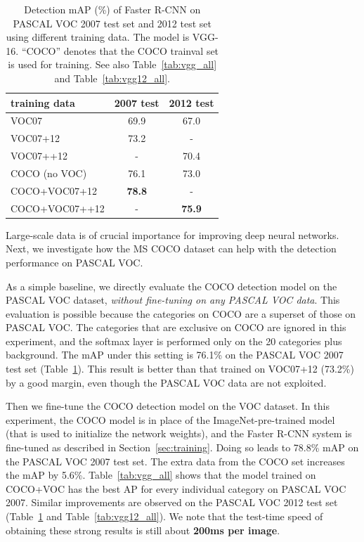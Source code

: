 \documentclass[10pt,journal,cspaper,compsoc]{IEEEtran}
\begin{document}
\setlength{\tabcolsep}{8pt}
\renewcommand{\arraystretch}{1.1}
\begin{table}[t]
\begin{center}
\caption{Detection mAP (\%) of Faster R-CNN on PASCAL VOC 2007 test set and 2012 test set using different training data. The model is VGG-16. ``COCO'' denotes that the COCO trainval set is used for training. See also Table~\ref{tab:vgg_all} and Table~\ref{tab:vgg12_all}.}
\vspace{-1em}
\small
\begin{tabular}{l|c|c}
  training data & 2007 test & 2012 test \\
  \hline\hline
  VOC07 & 69.9 & 67.0 \\
  VOC07+12 & 73.2 & - \\
  VOC07++12 & - & 70.4 \\
  \hline
  COCO (no VOC) & 76.1 & 73.0 \\
  COCO+VOC07+12 & \textbf{78.8} & - \\
  COCO+VOC07++12 & - & \textbf{75.9} \\
\end{tabular}
\label{tab:voc_coco}
\end{center}
\end{table}

Large-scale data is of crucial importance for improving deep neural networks. Next, we investigate how the MS COCO dataset can help with the detection performance on PASCAL VOC.

As a simple baseline, we directly evaluate the COCO detection model on the PASCAL VOC dataset, \emph{without fine-tuning on any PASCAL VOC data}. This evaluation is possible because the categories on COCO are a superset of those on PASCAL VOC. The categories that are exclusive on COCO are ignored in this experiment, and the softmax layer is performed only on the 20 categories plus background.
The mAP under this setting is 76.1\% on the PASCAL VOC 2007 test set (Table~\ref{tab:voc_coco}). This result is better than that trained on VOC07+12 (73.2\%) by a good margin, even though the PASCAL VOC data are not exploited.

Then we fine-tune the COCO detection model on the VOC dataset. In this experiment, the COCO model is in place of the ImageNet-pre-trained model (that is used to initialize the network weights), and the Faster R-CNN system is fine-tuned as described in Section~\ref{sec:training}. Doing so leads to 78.8\% mAP on the PASCAL VOC 2007 test set. The extra data from the COCO set increases the mAP by 5.6\%. Table~\ref{tab:vgg_all} shows that the model trained on COCO+VOC has the best AP for every individual category on PASCAL VOC 2007.
Similar improvements are observed on the PASCAL VOC 2012 test set (Table~\ref{tab:voc_coco} and Table~\ref{tab:vgg12_all}). We note that the test-time speed of obtaining these strong results is still about \textbf{200ms per image}.
\end{document}
